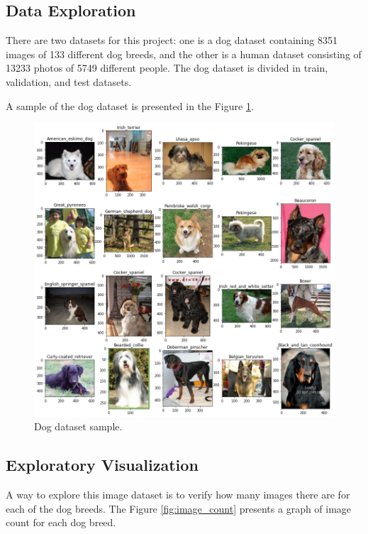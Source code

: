 \documentclass{article}
\begin{document}
    \subsection{Data Exploration}

    There are two datasets for this project: one is a dog dataset containing 8351 images of 133 different dog breeds, and the other is a human dataset consisting of 13233 photos of 5749 different people. The dog dataset is divided in train, validation, and test datasets.

    A sample of the dog dataset is presented in the Figure \ref{fig:dog_sample}.

    \begin{figure}[htbp]
        \centering
        \includegraphics[width=\linewidth]{img/sample.png}
        \caption{Dog dataset sample.}
        \label{fig:dog_sample}
    \end{figure}

    \subsection{Exploratory Visualization}

    A way to explore this image dataset is to verify how many images there are for each of the dog breeds. The Figure \ref{fig:image_count} presents a graph of image count for each dog breed.
\end{document}
